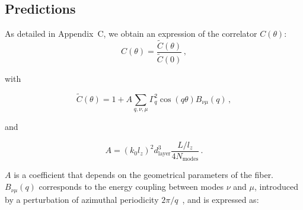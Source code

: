 \documentclass[aps,prl,twocolumn, amsmath,amssymb,superscriptaddress]{revtex4-2}
\begin{document}
 \subsection*{Predictions}

As detailed in Appendix~C, we obtain an expression of the correlator $C(\theta)$:
\begin{equation}
   C(\theta) = \frac{\tilde{C}(\theta) }{\tilde{C}(0) } \, ,
    \label{eq:theo}
\end{equation}

with

\begin{equation}
   \tilde{C}(\theta) =
            1+ 
            A\sum_{q,\nu,\mu} \Gamma_q^2 
             \cos(q\theta) 
             B_{\nu\mu}(q)\, ,
    \label{eq:theo2}
\end{equation}


and

\begin{equation}
    A = (k_0 l_z)^2  d_\text{layer}^3 \frac{L/l_z}{4N_\text{modes}} \, . %
\label{eq:A}
\end{equation}



$A$ is a coefficient that depends on the geometrical parameters of the fiber.
$B_{\nu\mu}(q)$ corresponds to the energy coupling between modes $\nu$ and $\mu$, 
introduced by a perturbation of azimuthal periodicity $2\pi/q$~\cite{Marcuse1973coupled, marcuse2013theory}, 
and is expressed as:
\end{document}
